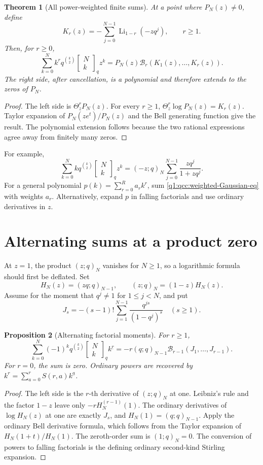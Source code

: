 \documentclass[11pt,a4paper,oneside,openany]{book}
\newtheorem{theorem}{Theorem}[chapter]
\newtheorem{proposition}[theorem]{Proposition}
\theoremstyle{definition}
\theoremstyle{remark}
\newcommand{\GB}[3][q]{\begin{bmatrix}#2\\#3\end{bmatrix}_{#1}}
\newcommand{\Y}[1]{\mathcal B_{#1}}
\newcommand{\fall}[2]{#1^{\underline{#2}}}
\DeclareMathOperator{\Li}{Li}
\begin{document}
\begin{theorem}[All power-weighted finite sums]\label{q1:qcc:weighted-Gaussian}
At a point where \(P_N(z)\ne0\), define
\[
 K_r(z)=-\sum_{j=0}^{N-1}\Li_{1-r}(-zq^j),\qquad r\ge1.
\]
Then, for \(r\ge0\),
\begin{equation}\label{q1:qcc:weighted-Gaussian-eq}
 \sum_{k=0}^{N}k^r q^{\binom k2}\GB Nk z^k
   =P_N(z)\Y r(K_1(z),\ldots,K_r(z)).
\end{equation}
The right side, after cancellation, is a polynomial and therefore extends to
the zeros of \(P_N\).
\end{theorem}
\begin{proof}
The left side is \(\Theta_z^rP_N(z)\). For every \(r\ge1\),
\(\Theta_z^r\log P_N(z)=K_r(z)\). Taylor expansion of
\(P_N(ze^t)/P_N(z)\) and the Bell generating function give the result.
The polynomial extension follows because the two rational expressions agree
away from finitely many zeros.
\end{proof}
For example,
\[
 \sum_{k=0}^{N}kq^{\binom k2}\GB Nk z^k
  =(-z;q)_N\sum_{j=0}^{N-1}\frac{zq^j}{1+zq^j}.
\]
For a general polynomial \(p(k)=\sum_{r=0}^{R}a_rk^r\), sum
\eqref{q1:qcc:weighted-Gaussian-eq} with weights \(a_r\). Alternatively,
expand \(p\) in falling factorials and use ordinary derivatives in \(z\).

\section{Alternating sums at a product zero}
At \(z=1\), the product \((z;q)_N\) vanishes for \(N\ge1\), so a
logarithmic formula should first be deflated. Set
\[
 H_N(z)=(zq;q)_{N-1},\qquad (z;q)_N=(1-z)H_N(z).
\]
Assume for the moment that \(q^j\ne1\) for \(1\le j<N\), and put
\begin{equation}\label{q1:qcc:alternating-kernels}
 J_s=-(s-1)!\sum_{j=1}^{N-1}
             \frac{q^{js}}{(1-q^j)^s}\quad(s\ge1).
\end{equation}

\begin{proposition}[Alternating factorial moments]\label{q1:qcc:alternating}
For \(r\ge1\),
\begin{equation}\label{q1:qcc:alternating-eq}
 \sum_{k=0}^{N}(-1)^kq^{\binom k2}\GB Nk\fall{k}{r}
   =-r(q;q)_{N-1}\Y{r-1}(J_1,\ldots,J_{r-1}).
\end{equation}
For \(r=0\), the sum is zero. Ordinary powers are recovered by
\(k^r=\sum_{a=0}^{r}S(r,a)\fall{k}{a}\).
\end{proposition}
\begin{proof}
The left side is the \(r\)-th derivative of \((z;q)_N\) at one.
Leibniz's rule and the factor \(1-z\) leave only
\(-rH_N^{(r-1)}(1)\). The ordinary derivatives of
\(\log H_N(z)\) at one are exactly \(J_s\), and
\(H_N(1)=(q;q)_{N-1}\). Apply the ordinary Bell derivative formula,
which follows from the Taylor expansion of \(H_N(1+t)/H_N(1)\).
The zeroth-order sum is \((1;q)_N=0\). The conversion of powers to
falling factorials is the defining ordinary second-kind Stirling expansion.
\end{proof}
\end{document}
